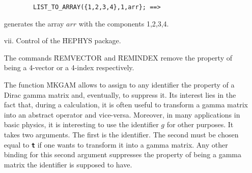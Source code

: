 \begin{itemize}
\begin{verbatim}
        LIST_TO_ARRAY({1,2,3,4},1,arr}; ==> 
\end{verbatim}
generates the array $arr$ with the components 1,2,3,4.
\item[vii.] Control of the \f{HEPHYS} package.  

The commands \f{REMVECTOR} and \f{REMINDEX} remove the property of 
being a 4-vector or a 4-index respectively. 

The function \f{MKGAM} allows to assign to any identifier the property 
of a Dirac gamma matrix and, eventually, to suppress it. Its interest lies 
in the fact that, during a calculation, it is often useful to transform 
a gamma matrix into an abstract operator and vice-versa. Moreover, in many 
applications in basic physics, it is interesting to use the identifier $g$ 
for other purposes.  
It takes two arguments. The first is the identifier. The second must be 
chosen equal to {\tt\bf t} if one wants to transform it into a gamma matrix. Any
other binding for this second argument suppresses the property of being 
a gamma matrix the identifier is supposed to have. 
\end{itemize}
